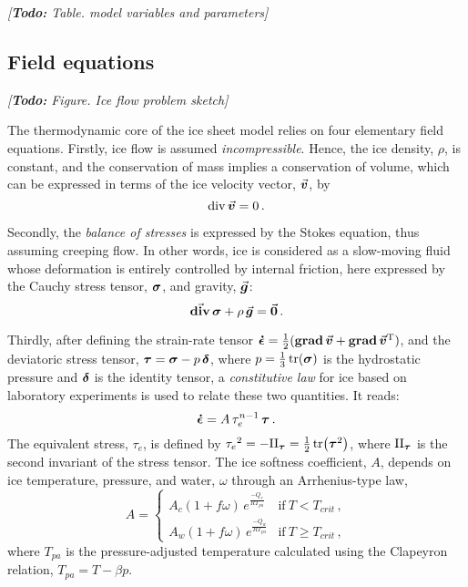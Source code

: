 \documentclass{article}
\newcommand{\todo}[1]{\emph{[\textbf{Todo:} #1]}}
\newcommand{\vect}[1]{\va*{#1}} %
\newcommand{\tens}[1]{\vb*{#1}} %
\renewcommand{\div}[1]{\mathrm{div}\,#1}            %
\newcommand{\tdiv}[1]{\vect{\mathrm{div}}\,#1}      %
\newcommand{\tgrad}[1]{\tens{\mathrm{grad}}\,#1}    %
\newcommand{\doteps}[0]{\dot{\epsilon}} %
\newcommand{\IDT}[0]{\tens{\delta}}     %
\newcommand{\CST}[0]{\tens{\sigma}}     %
\newcommand{\DST}[0]{\tens{\tau}}       %
\newcommand{\SRT}[0]{\tens{\doteps}}    %
\newcommand{\vv}[0]{\vect{v}}           %
\begin{document}
\todo{Table. model variables and parameters}

\subsection{Field equations}

\todo{Figure. Ice flow problem sketch}

The thermodynamic core of the ice sheet model relies on four elementary field
equations. Firstly, ice flow is assumed \emph{incompressible}. Hence, the ice
density, $\rho$, is constant, and the
conservation of mass implies a conservation of volume, which can be expressed
in terms of the ice velocity vector, $\vv$, by
\begin{equation}
    \label{eqn:incompressibility}
    \div{\vv} = 0 \,.
\end{equation}

Secondly, the \emph{balance of stresses} is expressed by the Stokes equation,
thus assuming creeping flow. In other words, ice is considered as a slow-moving
fluid whose deformation is entirely controlled by internal friction, here
expressed by the Cauchy stress tensor, $\CST$, and gravity, $\vect{g}$:
\begin{equation}
    \label{eqn:stressbalance}
    \tdiv{\CST} + \rho\,\vect{g} = \vect{0} \,.
\end{equation}

Thirdly, after defining the strain-rate tensor
${\SRT = \frac{1}{2}(\tgrad{\vv} + \tgrad{\vv}^{\mathrm{T}})}$,
and the deviatoric stress tensor, ${\DST = \CST - p\,\IDT}$,
where $p=\frac{1}{3}\tr(\CST)$ is the hydrostatic pressure and
$\tens{\delta}$ is the identity tensor, a \emph{constitutive law} for ice based
on laboratory experiments is used to relate these two quantities. It reads:
\begin{equation}
    \label{eqn:glenslaw}
    \SRT = A\,\tau_e^{n-1}\,\DST \,.
\end{equation}
The equivalent stress, $\tau_e$, is defined by
${\tau_e}^2 = -\mathrm{II}_{\DST} = \frac{1}{2} \tr(\DST^2)$,
where $\mathrm{II}_{\DST}$ is the second invariant of the stress tensor.
The ice softness coefficient, $A$, depends on ice temperature, pressure, and
water, $\omega$ through an Arrhenius-type law,
\begin{equation}
    A =
    \begin{cases}
        A_c (1+f\omega)\,e^\frac{-Q_c}{RT_{pa}}
            & \text{if}\ T < T_{crit} \,, \\
        A_w (1+f\omega)\,e^\frac{-Q_w}{RT_{pa}}
            & \text{if}\ T \ge T_{crit} \,,
    \end{cases}
\end{equation}
where $T_{pa}$ is the pressure-adjusted temperature calculated using the
Clapeyron relation, ${T_{pa} = T - \beta p}$.
\end{document}
